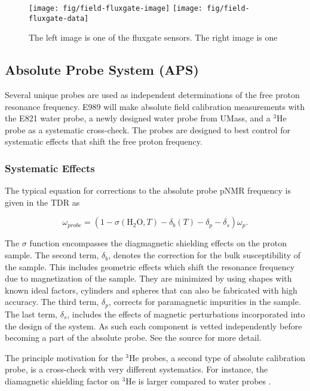 \begin{figure}
\label{fig:field-fluxgates}
\texttt{[image: fig/field-fluxgate-image]}
\texttt{[image: fig/field-fluxgate-data]}
\caption{The left image is one of the fluxgate sensors.  The right image is one }
\end{figure}

\subsection{Absolute Probe System (APS)}

Several unique probes are used as independent determinations of the free proton resonance frequency.  E989 will make absolute field calibration measurements with the E821 water probe, a newly designed water probe from UMass, and a $\mathrm{^3He}$ probe as a systematic cross-check. The probes are designed to best control for systematic effects that shift the free proton frequency.

\subsubsection{Systematic Effects}
The typical equation for corrections to the absolute probe pNMR frequency is given in the \mugmtwo TDR \cite{e989-tdr} as

\begin{equation}
\label{eqn:nmr-effects-model}
\omega_{probe} = (1 - \sigma(\mathrm{H_2 O}, T) - \delta_b(T) - \delta_p - \delta_s) \omega_p.
\end{equation}

\noindent
The $\sigma$ function encompasses the diagmagnetic shielding effects on the proton sample.  The second term, $\delta_b$, denotes the correction for the bulk susceptibility of the sample.  This includes geometric effects which shift the resonance frequency due to magnetization of the sample.  They are minimized by using shapes with known ideal factors, cylinders and spheres that can also be fabricated with high accuracy. The third term, $\delta_p$, corrects for paramagnetic impurities in the sample. The last term, $\delta_s$, includes the effects of magnetic perturbations incorporated into the design of the system.  As such each component is vetted independently before becoming a part of the absolute probe.  See the source \cite{e989-tdr} for more detail.

The principle motivation for the $\mathrm{^3He}$ probes, a second type of absolute calibration probe, is a cross-check with very different systematics.  For instance, the diamagnetic shielding factor on $\mathrm{^3He}$ is larger compared to water probes \cite{e989-tdr}.

